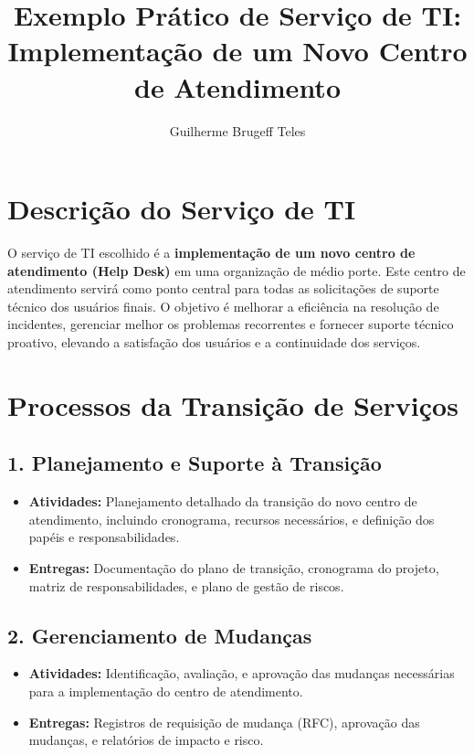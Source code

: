 \documentclass[a4paper,12pt]{article}
\title{Exemplo Prático de Serviço de TI: Implementação de um Novo Centro de Atendimento}
\author{Guilherme Brugeff Teles}
\date{}
\begin{document}
\maketitle

\section*{Descrição do Serviço de TI}
O serviço de TI escolhido é a \textbf{implementação de um novo centro de atendimento (Help Desk)} em uma organização de médio porte. Este centro de atendimento servirá como ponto central para todas as solicitações de suporte técnico dos usuários finais. O objetivo é melhorar a eficiência na resolução de incidentes, gerenciar melhor os problemas recorrentes e fornecer suporte técnico proativo, elevando a satisfação dos usuários e a continuidade dos serviços.

\section*{Processos da Transição de Serviços}

\subsection*{1. Planejamento e Suporte à Transição}
\begin{itemize}
    \item \textbf{Atividades:} Planejamento detalhado da transição do novo centro de atendimento, incluindo cronograma, recursos necessários, e definição dos papéis e responsabilidades.
    \item \textbf{Entregas:} Documentação do plano de transição, cronograma do projeto, matriz de responsabilidades, e plano de gestão de riscos.
\end{itemize}

\subsection*{2. Gerenciamento de Mudanças}
\begin{itemize}
    \item \textbf{Atividades:} Identificação, avaliação, e aprovação das mudanças necessárias para a implementação do centro de atendimento.
    \item \textbf{Entregas:} Registros de requisição de mudança (RFC), aprovação das mudanças, e relatórios de impacto e risco.
\end{itemize}
\end{document}
